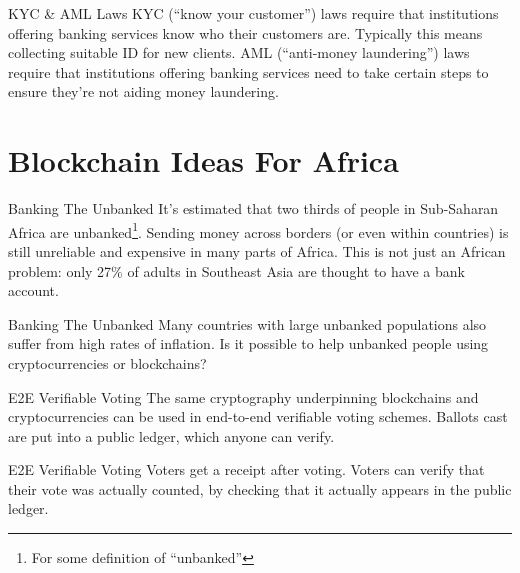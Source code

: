\documentclass[14pt]{beamer}
\begin{document}
\begin{frame}{KYC \& AML Laws}
  KYC (``know your customer'') laws require that institutions offering banking
  services know who their customers are. Typically this means collecting
  suitable ID for new clients.
  \newline
  \newline
  AML (``anti-money laundering'') laws require that institutions offering
  banking services need to take certain steps to ensure they're not aiding money
  laundering.
\end{frame}

\section{Blockchain Ideas For Africa}

\begin{frame}{Banking The Unbanked}
  It's estimated that two thirds of people in Sub-Saharan Africa are
  unbanked\footnote{For some definition of ``unbanked''}. Sending money across
  borders (or even within countries) is still unreliable and expensive in many
  parts of Africa.
  \newline
  \newline
  This is not just an African problem: only 27\% of adults in Southeast Asia are
  thought to have a bank account.
\end{frame}

\begin{frame}{Banking The Unbanked}
  Many countries with large unbanked populations also suffer from high rates of
  inflation.
  \newline
  \newline
  Is it possible to help unbanked people using cryptocurrencies or
  blockchains?
\end{frame}

\begin{frame}{E2E Verifiable Voting}
  The same cryptography underpinning blockchains and cryptocurrencies can be
  used in end-to-end verifiable voting schemes.
  \newline
  \newline
  Ballots cast are put into a public ledger, which anyone can verify.
\end{frame}

\begin{frame}{E2E Verifiable Voting}
  Voters get a receipt after voting.
  \newline
  \newline
  Voters can verify that their vote was actually counted, by checking that it
  actually appears in the public ledger.
\end{frame}
\end{document}
